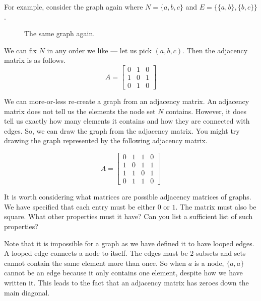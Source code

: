 \documentclass{iansnotes}
\begin{document}
  For example, consider the graph again where $N = \{a, b, c\}$ and $E = \{ \{a, b\}, \{b, c\} \}$.
  \begin{figure}
    \centering
    \caption{The same graph again.}
    \label{figure:thesamegraph}
  \end{figure}
  We can fix $N$ in any order we like --- let us pick $(a,b,c)$.
  Then the adjacency matrix is as follows.
  \[ A = \begin{bmatrix} 0 & 1 & 0 \\ 1 & 0 & 1 \\ 0 & 1 & 0 \end{bmatrix} \]
  
  We can more-or-less re-create a graph from an adjacency matrix.
  An adjacency matrix does not tell us the elements the node set $N$ contains.
  However, it does tell us exactly how many elements it contains and how they are connected with edges.
  So, we can draw the graph from the adjacency matrix.
  You might try drawing the graph represented by the following adjacency matrix.

  \[ A = \begin{bmatrix} 0 & 1 & 1 & 0 \\ 1 & 0 & 1 & 1 \\ 1 & 1 & 0 & 1 \\ 0 & 1 & 1 & 0 \end{bmatrix} \]

  It is worth considering what matrices are possible adjacency matrices of graphs.
  We have specified that each entry must be either $0$ or $1$.
  The matrix must also be square.
  What other properties must it have?
  Can you list a sufficient list of such properties?

  Note that it is impossible for a graph as we have defined it to have looped edges.
  A looped edge connects a node to itself.
  The edges must be $2$-subsets and sets cannot contain the same element more than once.
  So when $a$ is a node, $\{ a, a \}$ cannot be an edge because it only contains one element, despite how we have written it.
  This leads to the fact that an adjacency matrix has zeroes down the main diagonal.
    
\end{document}
